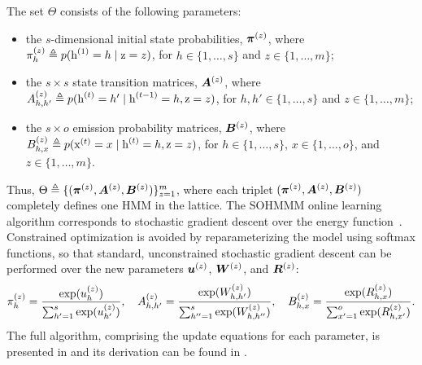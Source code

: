 The set $\Theta$ consists of the following parameters:
\begin{itemize}
    \item the $s$-dimensional initial state probabilities, ${\bm{\pi}}^{(z)}$, where ${\pi}_h^{(z)} \triangleq p({\textnormal{h}}^{(1)}=h \mid {\textnormal{z}}=z)$, for $h \in \{1,\dots,s\}$ and $z \in \{1,\dots,m\}$;
    \item the $s \times s$ state transition matrices, ${\bm{A}}^{(z)}$, where ${A}^{(z)}_{h,h'} \triangleq p({\textnormal{h}}^{(t)}=h' \mid {\textnormal{h}}^{(t-1)}=h, {\textnormal{z}}=z)$, for $h,h' \in \{1,\dots,s\}$ and $z \in \{1,\dots,m\}$;
    \item the $s \times o$ emission probability matrices, ${\bm{B}}^{(z)}$, where ${B}^{(z)}_{h,x} \triangleq p({\textnormal{x}}^{(t)}=x \mid {\textnormal{h}}^{(t)}=h, {\textnormal{z}}=z)$, for $h \in \{1,\dots,s\}$, $x \in \{1,\dots,o\}$, and $z \in \{1,\dots,m\}$.
\end{itemize}
Thus, $\Theta \triangleq \{({\bm{\pi}}^{(z)}, {\bm{A}}^{(z)}, {\bm{B}}^{(z)})\}_{z=1}^m$, where each triplet $({\bm{\pi}}^{(z)}, {\bm{A}}^{(z)}, {\bm{B}}^{(z)})$ completely defines one HMM in the lattice. The SOHMMM online learning algorithm corresponds to stochastic gradient descent over the energy function~. Constrained optimization is avoided by reparameterizing the model using softmax functions, so that standard, unconstrained stochastic gradient descent can be performed over the new parameters ${\bm{u}}^{(z)}$, ${\bm{W}}^{(z)}$, and ${\bm{R}}^{(z)}$:
\begin{equation}
    {\pi}_h^{(z)} = \frac{\exp({u}_h^{(z)})}{\sum_{h'=1}^{s}\exp({u}_{h'}^{(z)})}, \quad
    {A}^{(z)}_{h,h'} = \frac{\exp({W}^{(z)}_{h,h'})}{\sum_{h''=1}^{s} \exp({W}^{(z)}_{h,h''})}, \quad
    {B}^{(z)}_{h,x} = \frac{\exp({R}^{(z)}_{h,x})}{\sum_{x'=1}^{o} \exp({R}^{(z)}_{h,x'})}.
\end{equation}
The full algorithm, comprising the update equations for each parameter, is presented in  and its derivation can be found in \citet{Ferles2008}.

